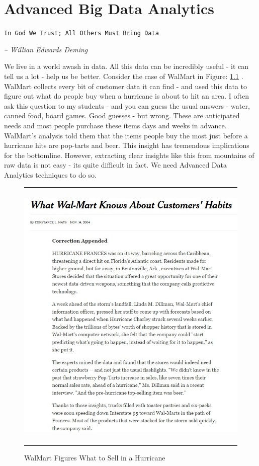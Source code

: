 \documentclass[11pt, letterpaper, twoside]{memoir}\usepackage{knitr}
\begin{document}
\chapter{Advanced Big Data Analytics}

\begin{flushright}
\texttt{In God We Trust; All Others Must Bring Data}

\emph{-- Willian Edwards Deming}
\end{flushright}

\vspace{12pt}

We live in a world awash in data. All this data can be incredibly useful - it can tell us a lot - help us be better. Consider the case of WalMart in Figure: \ref{fig:frances} \citep{WhatT45:online}. WalMart collects every bit of customer data it can find - and used this data to figure out what do people buy when a hurricane is about to hit an area. I often ask this question to my students - and you can guess the usual answers - water, canned food, board games. Good guesses - but wrong. These are anticipated needs and most people purchase these items days and weeks in advance. WalMart's analysis told them that the items people buy the most just before a hurricane hits are  pop-tarts and beer. This insight has tremendous implications for the bottomline. However, extracting clear insights like this from mountains of raw data is not easy - its quite difficult in fact. We need Advanced Data Analytics techniques to do so.  

\begin{figure}
\rule{4in}{1pt}
\centering
\includegraphics[height=5in]{images/NYTFrances.jpg}
\caption{WalMart Figures What to Sell in a Hurricane}
\label{fig:frances}
\rule{4in}{1pt}
\end{figure}
\end{document}

